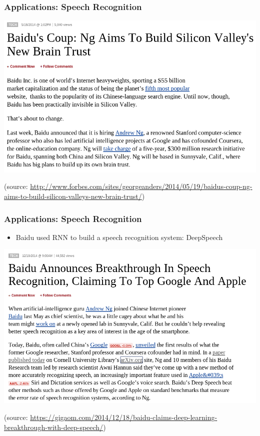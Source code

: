 \begin{frame}
  \frametitle{Applications: Speech Recognition}
  \begin{center}
    \includegraphics[width=.8\textwidth]{graphics/baidu1}
  \end{center}
  \begin{center}
    {\tiny (source: \url{http://www.forbes.com/sites/georgeanders/2014/05/19/baidus-coup-ng-aims-to-build-silicon-valleys-new-brain-trust/})}
  \end{center}
\end{frame}

\begin{frame}
  \frametitle{Applications: Speech Recognition}
  \begin{itemize}
  \item Baidu used RNN to build a speech recognition system:
    DeepSpeech
  \end{itemize}
  \begin{center}
    \includegraphics[width=.5\textwidth]{graphics/baidu}
  \end{center}
  \begin{center}{\small
    \nobibliography* {}
  }\end{center}
  \begin{center}
    {\tiny (source:
      \url{https://gigaom.com/2014/12/18/baidu-claims-deep-learning-breakthrough-with-deep-speech/})}
  \end{center}

\end{frame}

